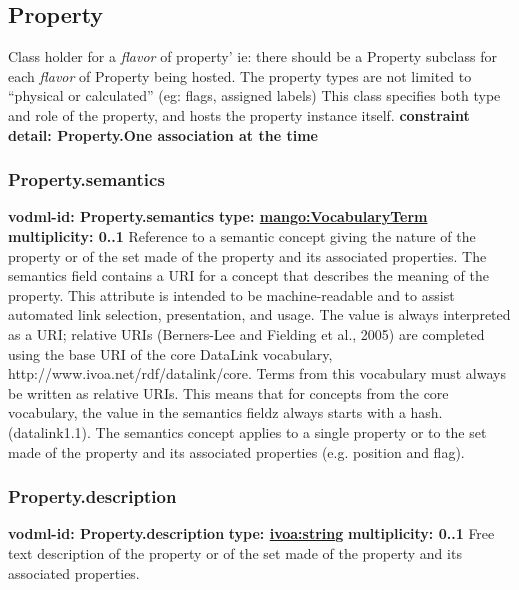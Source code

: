   \subsection{Property}
    \label{sect:Property}
    Class holder for a \textit{flavor} of property’ ie: there should be a Property subclass for each \textit{flavor} of Property being hosted. The property types are not limited to “physical or calculated” (eg: flags, assigned labels) This class specifies both type and role of the property, and hosts the property instance itself.
    \noindent \textbf{constraint} \newline
    \indent    \textbf{detail: Property.One association at the time
    }\newline

    \subsubsection{Property.semantics}
    \textbf{vodml-id: Property.semantics} \newline
    \textbf{type: \hyperref[sect:VocabularyTerm]{mango:VocabularyTerm}} \newline
    \textbf{multiplicity: 0..1} \newline
    Reference to a semantic concept giving the nature of the property or of the set made of the property and its associated properties. The semantics field contains a URI for a concept that describes the meaning of the property. This attribute is intended to be machine-readable and to assist automated link selection, presentation, and usage. The value is always interpreted as a URI; relative URIs (Berners-Lee and Fielding et al., 2005) are completed using the base URI of the core DataLink vocabulary, http://www.ivoa.net/rdf/datalink/core. Terms from this vocabulary must always be written as relative URIs. This means that for concepts from the core vocabulary, the value in the semantics fieldz always starts with a hash. (datalink1.1). The semantics concept applies to a single property or to the set made of the property and its associated properties (e.g. position and flag).

    \subsubsection{Property.description}
    \textbf{vodml-id: Property.description} \newline
    \textbf{type: \hyperref[sect:ivoa]{ivoa:string}} \newline
    \textbf{multiplicity: 0..1} \newline
    Free text description of the property or of the set made of the property and its associated properties.

